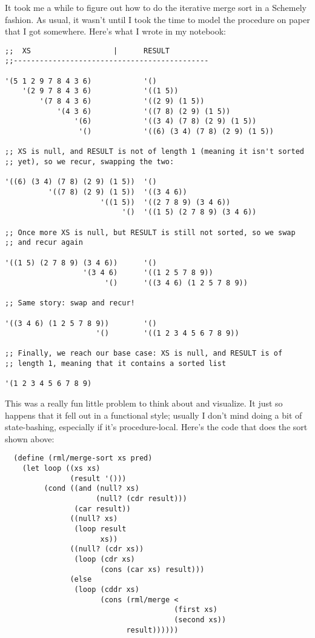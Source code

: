 \documentclass[12pt,openright,draft]{book}
\begin{document}
It took me a while to figure out how to do the iterative merge sort in
a Schemely fashion. As usual, it wasn't until I took the time to model
the procedure on paper that I got somewhere. Here's what I wrote in my
notebook:

\begin{verbatim}
;;  XS                   |      RESULT
;;---------------------------------------------

'(5 1 2 9 7 8 4 3 6)            '()
    '(2 9 7 8 4 3 6)            '((1 5))
        '(7 8 4 3 6)            '((2 9) (1 5))
            '(4 3 6)            '((7 8) (2 9) (1 5))
                '(6)            '((3 4) (7 8) (2 9) (1 5))
                 '()            '((6) (3 4) (7 8) (2 9) (1 5))

;; XS is null, and RESULT is not of length 1 (meaning it isn't sorted
;; yet), so we recur, swapping the two:

'((6) (3 4) (7 8) (2 9) (1 5))  '()
          '((7 8) (2 9) (1 5))  '((3 4 6))
                      '((1 5))  '((2 7 8 9) (3 4 6))
                           '()  '((1 5) (2 7 8 9) (3 4 6))

;; Once more XS is null, but RESULT is still not sorted, so we swap
;; and recur again

'((1 5) (2 7 8 9) (3 4 6))      '()
                  '(3 4 6)      '((1 2 5 7 8 9))
                       '()      '((3 4 6) (1 2 5 7 8 9))

;; Same story: swap and recur!

'((3 4 6) (1 2 5 7 8 9))        '()
                     '()        '((1 2 3 4 5 6 7 8 9))

;; Finally, we reach our base case: XS is null, and RESULT is of
;; length 1, meaning that it contains a sorted list

'(1 2 3 4 5 6 7 8 9)
\end{verbatim}

This was a really fun little problem to think about and visualize. It
just so happens that it fell out in a functional style; usually I
don't mind doing a bit of state-bashing, especially if it's
procedure-local. Here's the code that does the sort shown above:

\begin{verbatim}
  (define (rml/merge-sort xs pred)
    (let loop ((xs xs)
               (result '()))
         (cond ((and (null? xs)
                     (null? (cdr result)))
                (car result))
               ((null? xs)
                (loop result
                      xs))
               ((null? (cdr xs))
                (loop (cdr xs)
                      (cons (car xs) result)))
               (else
                (loop (cddr xs)
                      (cons (rml/merge <
                                       (first xs)
                                       (second xs))
                            result))))))
\end{verbatim}
\end{document}
